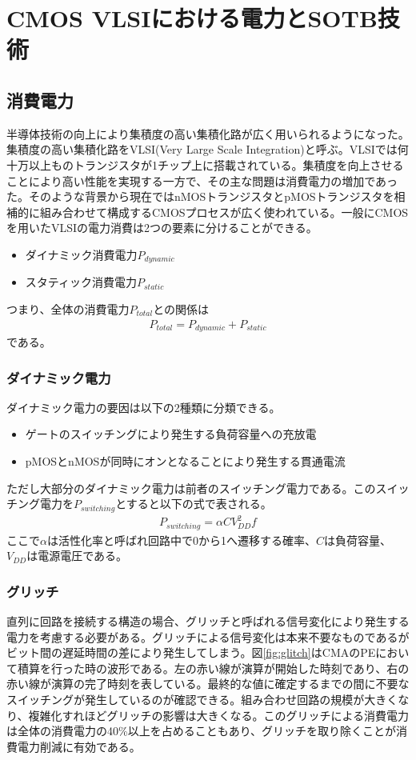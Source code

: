 \chapter{CMOS VLSIにおける電力とSOTB技術}
{
\label{chap:vlsi}
\section{消費電力}
\label{sec:power}
半導体技術の向上により集積度の高い集積化路が広く用いられるようになった。集積度の高い集積化路をVLSI(Very Large Scale Integration)と呼ぶ。VLSIでは何十万以上ものトランジスタが1チップ上に搭載されている。集積度を向上させることにより高い性能を実現する一方で、その主な問題は消費電力の増加であった。そのような背景から現在ではnMOSトランジスタとpMOSトランジスタを相補的に組み合わせて構成するCMOSプロセスが広く使われている。一般にCMOSを用いたVLSIの電力消費は2つの要素に分けることができる。
\begin{itemize}
\item ダイナミック消費電力$P_{dynamic}$
\item スタティック消費電力$P_{static}$
\end{itemize}

つまり、全体の消費電力$P_{total}$との関係は
\begin{eqnarray}
P_{total} = P_{dynamic} + P_{static}
\end{eqnarray}
である。
\subsection{ダイナミック電力}
\label{subsec:dynamic_power}
ダイナミック電力の要因は以下の2種類に分類できる。
\begin{itemize}
\item ゲートのスイッチングにより発生する負荷容量への充放電
\item pMOSとnMOSが同時にオンとなることにより発生する貫通電流
\end{itemize}
ただし大部分のダイナミック電力は前者のスイッチング電力である。このスイッチング電力を$P_{switching}$とすると以下の式で表される。\cite{west}
\begin{eqnarray}
P_{switching} = \alpha C V^2_{DD}f
\end{eqnarray}
ここで$\alpha$は活性化率と呼ばれ回路中で0から1へ遷移する確率、$C$は負荷容量、$V_{DD}$は電源電圧である。

\subsection{グリッチ}
\label{subsec:glitch}
直列に回路を接続する構造の場合、グリッチと呼ばれる信号変化により発生する電力を考慮する必要がある。グリッチによる信号変化は本来不要なものであるがビット間の遅延時間の差により発生してしまう。図\ref{fig:glitch}はCMAのPEにおいて積算を行った時の波形である。左の赤い線が演算が開始した時刻であり、右の赤い線が演算の完了時刻を表している。最終的な値に確定するまでの間に不要なスイッチングが発生しているのが確認できる。組み合わせ回路の規模が大きくなり、複雑化すれほどグリッチの影響は大きくなる。このグリッチによる消費電力は全体の消費電力の40\%以上を占めることもあり、グリッチを取り除くことが消費電力削減に有効である。\cite{glitch}

}
